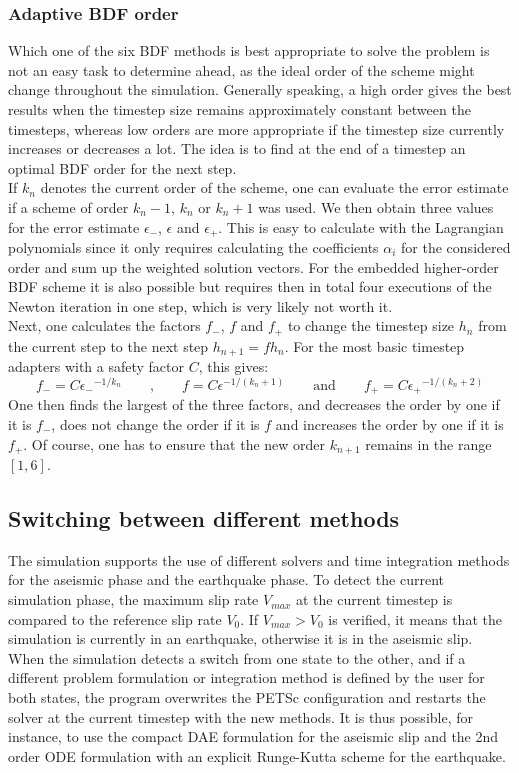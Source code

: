 \subsubsection{Adaptive BDF order}
\label{sssec:adaptiveBDFOrder}
Which one of the six BDF methods is best appropriate to solve the problem is not an easy task to determine ahead, as the ideal order of the scheme might change throughout the simulation. Generally speaking, a high order gives the best results when the timestep size remains approximately constant between the timesteps, whereas low orders are more appropriate if the timestep size currently increases or decreases a lot. The idea is to find at the end of a timestep an optimal BDF order for the next step. \\
If $k_n$ denotes the current order of the scheme, one can evaluate the error estimate if a scheme of order $k_n-1$, $k_n$ or $k_n+1$ was used. We then obtain three values for the error estimate $\epsilon_-$, $\epsilon$ and $\epsilon_+$. This is easy to calculate with the Lagrangian polynomials since it only requires calculating the coefficients $\alpha_i$ for the considered order and sum up the weighted solution vectors. For the embedded higher-order BDF scheme it is also possible but requires then in total four executions of the Newton iteration in one step, which is very likely not worth it. \\
Next, one calculates the factors $f_-$, $f$ and $f_+$ to change the timestep size $h_n$ from the current step to the next step $h_{n+1} = fh_n$. For the most basic timestep adapters with a safety factor $C$, this gives: 
\begin{equation}
f_- = C{\epsilon_-}^{-1/k_n} \qquad \text{,}\qquad 
f   = C{\epsilon}^{-1/(k_n+1)} \qquad \text{and}\qquad 
f_+ = C{\epsilon_+}^{-1/(k_n+2)}
\end{equation}
One then finds the largest of the three factors, and decreases the order by one if it is $f_-$, does not change the order if it is $f$ and increases the order by one if it is $f_+$. Of course, one has to ensure that the new order $k_{n+1}$ remains in the range $[1,6]$.

\subsection{Switching between different methods}
The simulation supports the use of different solvers and time integration methods for the aseismic phase and the earthquake phase. To detect the current simulation phase, the maximum slip rate $V_{max}$ at the current timestep is compared to the reference slip rate $V_0$. If $V_{max}>V_0$ is verified, it means that the simulation is currently in an earthquake, otherwise it is in the aseismic slip. When the simulation detects a switch from one state to the other, and if a different problem formulation or integration method is defined by the user for both states, the program overwrites the PETSc configuration and restarts the solver at the current timestep with the new methods. It is thus possible, for instance, to use the compact DAE formulation for the aseismic slip and the 2nd order ODE formulation with an explicit Runge-Kutta scheme for the earthquake. 

